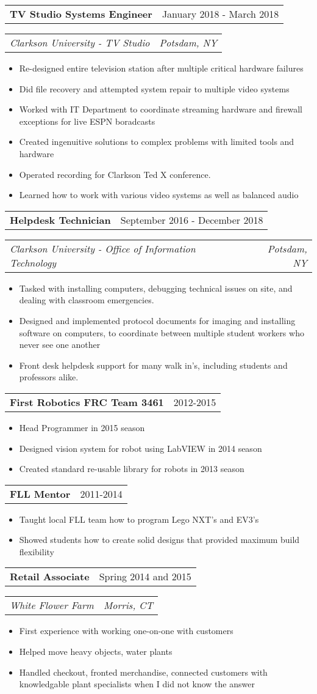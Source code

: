 \documentclass[letterpaper,12pt]{article}
\makeatletter
\newcommand{\resitem}[1]{\item #1 \vspace{-3pt}}
\newcommand{\topheading}[2]{
\begin{tabular*}{6.5in}{l@{\extracolsep{\fill}}r}
		\textbf{#1} & #2 \\
\end{tabular*}}
\newcommand{\bottomheading}[2]{
\begin{tabular*}{6.5in}{l@{\extracolsep{\fill}}r}
		\textit{#1} & \textit{#2} \\
\end{tabular*}\vspace{-6pt}}
\newcommand{\singleheading}[2]{
\vspace{6pt}
\begin{tabular*}{6.5in}{l@{\extracolsep{\fill}}r}
		\textbf{#1} & #2 \\
\end{tabular*}
\vspace{-3pt}
}
\makeatother
\begin{document}
\begin{itemize}
	\topheading{TV Studio Systems Engineer}{January 2018 - March 2018}
	\bottomheading{Clarkson University - TV Studio}{Potsdam, NY}
	\begin{itemize}
		\resitem{Re-designed entire television station after multiple critical hardware failures}
		\resitem{Did file recovery and attempted system repair to multiple video systems}
		\resitem{Worked with IT Department to coordinate streaming hardware and firewall exceptions for live ESPN boradcasts}
		\resitem{Created ingenuitive solutions to complex problems with limited tools and hardware}
		\resitem{Operated recording for Clarkson Ted X conference.}
		\resitem{Learned how to work with various video systems as well as balanced audio}
	\end{itemize}

	\topheading{Helpdesk Technician}{September 2016 - December 2018}
	\bottomheading{Clarkson University - Office of Information Technology}{Potsdam, NY}
	\begin{itemize}
		\resitem{Tasked with installing computers, debugging technical issues on site, and dealing with classroom emergencies.}
		\resitem{Designed and implemented protocol documents for imaging and installing software on computers, to coordinate between multiple student workers who never see one another}
		\resitem{Front desk helpdesk support for many walk in's, including students and professors alike.}
	\end{itemize}

	\newpage

	\singleheading{First Robotics FRC Team 3461}{2012-2015}
	\begin{itemize}
		\resitem{Head Programmer in 2015 season}
		\resitem{Designed vision system for robot using LabVIEW in 2014 season}
		\resitem{Created standard re-usable library for robots in 2013 season}
	\end{itemize}

	\singleheading{FLL Mentor}{2011-2014}
	\begin{itemize}
		\resitem{Taught local FLL team how to program Lego NXT's and EV3's}
		\resitem{Showed students how to create solid designs that provided maximum build flexibility}
	\end{itemize}

	\topheading{Retail Associate}{Spring 2014 and 2015}
	\bottomheading{White Flower Farm}{Morris, CT}
	\begin{itemize}
		\resitem{First experience with working one-on-one with customers}
		\resitem{Helped move heavy objects, water plants}
		\resitem{Handled checkout, fronted merchandise, connected customers with knowledgable plant specialists when I did not know the answer}
	\end{itemize}


\end{itemize}
\end{document}
